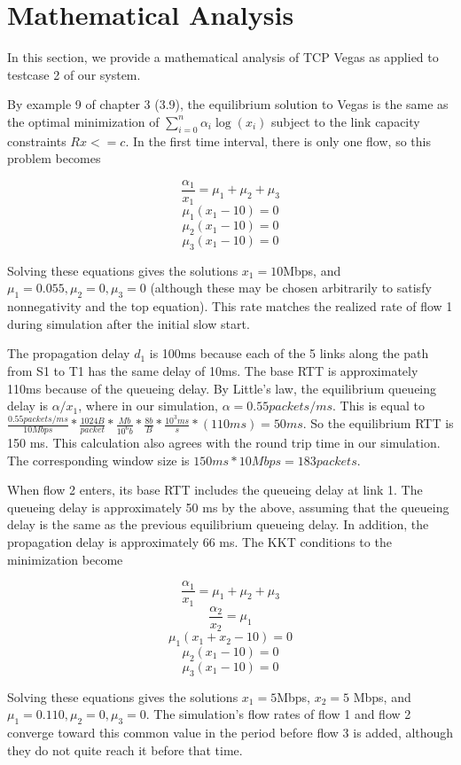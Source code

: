 

\section{Mathematical Analysis}

In this section, we provide a mathematical analysis of TCP Vegas as applied to testcase 2 of our system. 

By example 9 of chapter 3 (3.9), the equilibrium solution to Vegas is the same as the optimal minimization of $\displaystyle\sum\limits_{i=0}^n \alpha_i \log(x_i)$ subject to the link capacity constraints $Rx <= c$. In the first time interval, there is only one flow, so this problem becomes

$$\frac{\alpha_1}{x_1}=\mu_1 + \mu_2 + \mu_3$$
$$\mu_1 (x_1 - 10) = 0$$
$$\mu_2 (x_1 - 10) = 0$$
$$\mu_3 (x_1 - 10) = 0$$

Solving these equations gives the solutions $x_1=10$Mbps, and $\mu_1 = 0.055, \mu_2 = 0, \mu_3 = 0$ (although these may be chosen arbitrarily to satisfy nonnegativity and the top equation). This rate matches the realized rate of flow 1 during simulation after the initial slow start.

The propagation delay $d_1$ is 100ms because each of the 5 links along the path from S1 to T1 has the same delay of 10ms. The base RTT is approximately 110ms because of the queueing delay. By Little's law, the equilibrium queueing delay is $\alpha /  x_1$, where in our simulation, $\alpha = 0.55 packets/ms$. This is equal to $\frac{0.55 packets/ms}{10 Mbps} * \frac{1024 B}{packet} * \frac{Mb}{10^6 b} * \frac{8 b}{B} * \frac{10^3 ms}{s} * (110 ms) = 50 ms$. So the equilibrium RTT is 150 ms. This calculation also agrees with the round trip time in our simulation. The corresponding window size is $150ms * 10Mbps = 183 packets$.

When flow 2 enters, its base RTT includes the queueing delay at link 1. The queueing delay is approximately 50 ms by the above, assuming that the queueing delay is the same as the previous equilibrium queueing delay. In addition, the propagation delay is approximately 66 ms. The KKT conditions to the minimization become

$$\frac{\alpha_1}{x_1}=\mu_1+\mu_2+\mu_3$$
$$\frac{\alpha_2}{x_2}=\mu_1$$
$$\mu_1 (x_1 + x_2 - 10) = 0$$
$$\mu_2 (x_1 - 10) = 0$$
$$\mu_3 (x_1 - 10) = 0$$

Solving these equations gives the solutions $x_1 = 5$Mbps, $x_2 = 5$ Mbps, and $\mu_1 = 0.110, \mu_2 = 0, \mu_3 = 0$. The simulation's flow rates of flow 1 and flow 2 converge toward this common value in the period before flow 3 is added, although they do not quite reach it before that time.

